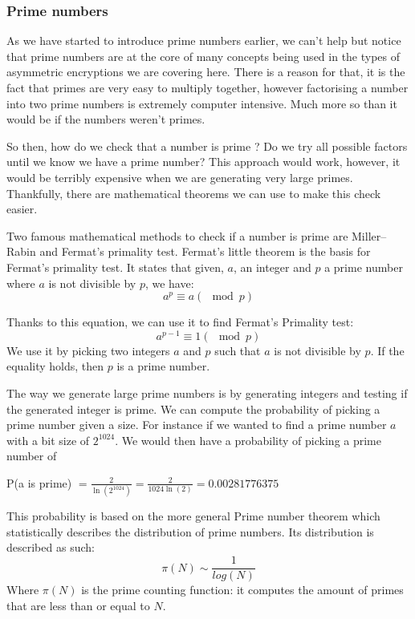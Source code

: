 \documentclass[conference]{IEEEtran}
\begin{document}
\subsubsection*{Prime numbers}
As we have started to introduce prime numbers earlier, we can't help 
but notice that prime numbers are at the core of many concepts being
used in the types of  asymmetric encryptions we are covering here. 
There is a reason for that, it is the fact that primes are very easy to 
multiply together, however factorising a number into two prime numbers is 
extremely computer intensive. Much more so than it would be if the numbers 
weren't primes. 

So then, how do we check that a number is prime ? Do we try all possible factors
until we know we have a prime number? This approach would work, however, it 
would be terribly expensive when we are generating very large primes.
Thankfully, there are mathematical theorems we can use to make this check easier.

Two famous mathematical methods to check if a number is prime 
are Miller–Rabin and Fermat's primality test. 
Fermat's little theorem is the basis for Fermat's primality test. It states that
given, $a$, an integer and $p$ a prime number where $a$ is not divisible by $p$, we have:
\begin{equation*}
    a^{p} \equiv a (\mod p)
\end{equation*}

Thanks to this equation, we can use it to find Fermat's Primality test: 
\begin{equation*}
    a^{p - 1} \equiv 1 (\mod p)
\end{equation*}
We use it by picking two integers $a$ and $p$ such that $a$ is not divisible by $p$.
If the equality holds, then $p$ is a prime number.

The way we generate large prime numbers is by generating integers and testing if the generated integer is
prime. We can compute the probability of picking a prime number given a size. For instance if we wanted to 
find a prime number $a$ with a bit size of $2^{1024}$. We would then have a probability of picking a prime
number of \\
\begin{center}
    P(a is prime) $= \frac{2}{\ln(2^{1024})} = \frac{2}{1024\ln(2)} = 0.00281776375$
\end{center}
This probability is based on the more general Prime number theorem which statistically describes the distribution of prime numbers.
Its distribution is described as such:
\begin{equation*}
    \pi(N) \sim \frac{1}{log(N)}
\end{equation*}
Where $\pi(N)$ is the prime counting function: it computes the amount of primes
that are less than or equal to $N$.
\end{document}
